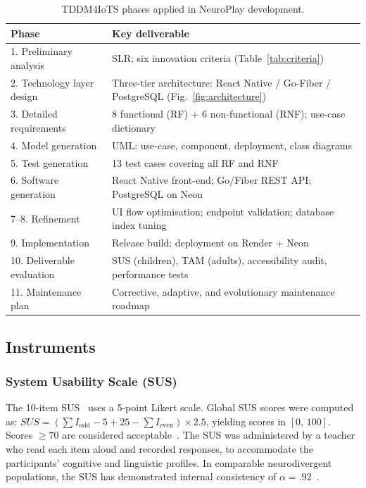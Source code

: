 \documentclass[preprint,12pt]{elsarticle}
\begin{document}
            \begin{table}[t]
                \centering
                \caption{TDDM4IoTS phases applied in NeuroPlay development.}
                \label{tab:phases}
                \begin{tabular}{@{}p{4cm}p{8cm}@{}}
                    \toprule
                    \textbf{Phase} & \textbf{Key deliverable} \\
                    \midrule
                    1. Preliminary analysis     & SLR; six innovation criteria (Table~\ref{tab:criteria}) \\
                    2. Technology layer design  & Three-tier architecture: React Native / Go-Fiber / PostgreSQL (Fig.~\ref{fig:architecture}) \\
                    3. Detailed requirements    & 8 functional (RF) + 6 non-functional (RNF); use-case dictionary \\
                    4. Model generation         & UML: use-case, component, deployment, class diagrams \\
                    5. Test generation          & 13 test cases covering all RF and RNF \\
                    6. Software generation      & React Native front-end; Go/Fiber REST API; PostgreSQL on Neon \\
                    7--8. Refinement            & UI flow optimisation; endpoint validation; database index tuning \\
                    9. Implementation           & Release build; deployment on Render + Neon \\
                    10. Deliverable evaluation  & SUS (children), TAM (adults), accessibility audit, performance tests \\
                    11. Maintenance plan        & Corrective, adaptive, and evolutionary maintenance roadmap \\
                    \bottomrule
                \end{tabular}
            \end{table}
        
        \subsection{Instruments}
        \label{subsec:instruments}
            
            \subsubsection{System Usability Scale (SUS)}
                The 10-item SUS~\cite{Brooke1996} uses a 5-point Likert scale. Global SUS scores were computed as: $\mathit{SUS} = (\sum I_{\text{odd}} - 5 + 25 - \sum I_{\text{even}}) \times 2.5$, yielding scores in $[0,\,100]$. Scores $\geq 70$ are considered acceptable~\cite{Bangor2008}. The SUS was administered by a teacher who read each item aloud and recorded responses, to accommodate the participants' cognitive and linguistic profiles. In comparable neurodivergent populations, the SUS has demonstrated internal consistency of $\alpha = .92$~\cite{Bangor2008}.
            
\end{document}
